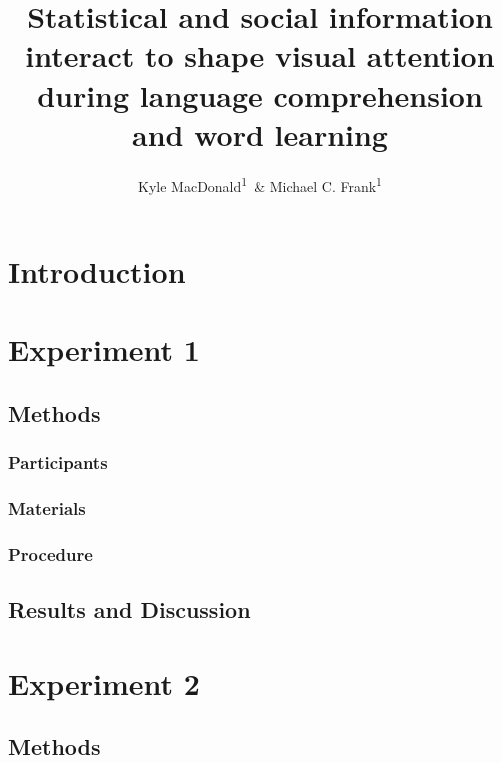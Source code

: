 \documentclass[man,floatsintext]{apa6}
\title{Statistical and social information interact to shape visual attention
during language comprehension and word learning}
\author{Kyle MacDonald\textsuperscript{1}~\& Michael C. Frank\textsuperscript{1}}
\date{}
\affiliation{
\vspace{0.5cm}
\textsuperscript{1} Stanford University}
\begin{document}
\maketitle

\hypertarget{introduction}{%
\section{Introduction}\label{introduction}}

\hypertarget{experiment-1}{%
\section{Experiment 1}\label{experiment-1}}

\hypertarget{methods}{%
\subsection{Methods}\label{methods}}

\hypertarget{participants}{%
\subsubsection{Participants}\label{participants}}

\hypertarget{materials}{%
\subsubsection{Materials}\label{materials}}

\hypertarget{procedure}{%
\subsubsection{Procedure}\label{procedure}}

\hypertarget{results-and-discussion}{%
\subsection{Results and Discussion}\label{results-and-discussion}}

\hypertarget{experiment-2}{%
\section{Experiment 2}\label{experiment-2}}

\hypertarget{methods-1}{%
\subsection{Methods}\label{methods-1}}
\end{document}
